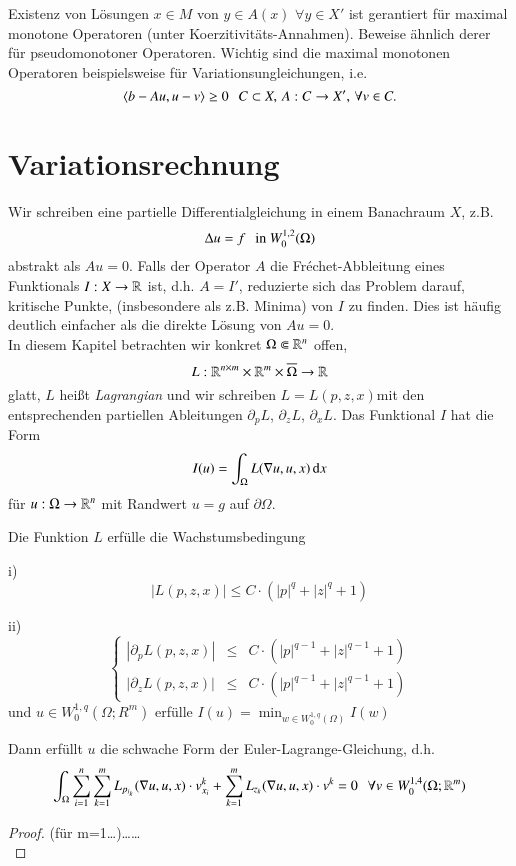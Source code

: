 Existenz von Lösungen $x\in M$ von $y\in A(x)$ $\forall y\in X'$ ist gerantiert für maximal monotone
Operatoren (unter Koerzitivitäts-Annahmen). Beweise ähnlich derer für pseudomonotoner Operatoren.
Wichtig sind die maximal monotonen Operatoren beispielsweise für Variationsungleichungen, i.e.
\[
    \langle b-Au,u-v\rangle \geq 0 \hspace{.25cm} C\subset X, \, A:C\rightarrow X',\, \forall v\in C.
\]

\newpage

\chapter{Variationsrechnung}

Wir schreiben eine partielle Differentialgleichung in einem Banachraum $X$, z.B.
\[
    \Delta u = f \hspace{.25cm} \text{in }W_0^{1,2}(\Omega)
\]
abstrakt als $Au=0$. Falls der Operator $A$ die Fréchet-Abbleitung eines Funktionals $I:X\rightarrow\mathbb{R}$ ist,
d.h. $A=I'$, reduzierte sich das Problem darauf, kritische Punkte, (insbesondere als z.B. Minima) von
$I$ zu finden. Dies ist häufig deutlich einfacher als die direkte Lösung von $Au=0$.\\
\noindent In diesem Kapitel betrachten wir konkret $\Omega \Subset \mathbb{R}^n$ offen,
\[
    L:\mathbb{R}^{n\times m} \times \mathbb{R}^m \times \overline \Omega \rightarrow \mathbb{R}
\]
glatt, $L$ heißt \textit{Lagrangian} und wir schreiben $L= L(p,z,x)$mit den entsprechenden partiellen
Ableitungen $\partial_p L$, $\partial_zL$, $\partial_x L$. Das Funktional $I$ hat die Form
\[
    I(u)=\int_\Omega L(\nabla u , u , x) \, \mathrm{d} x
\]
für $u:\Omega\rightarrow \mathbb{R}^n$ mit Randwert $u=g$ auf $\partial \Omega$.

\begin{theorem}\label{5.1}
    Die Funktion $L$ erfülle die Wachstumsbedingung
    \begin{description}
    \item{i)}
    \[|L(p,z,x)|\leq C\cdot(|p|^q+|z|^q+1) \]
    \item{ii)}
    \[
        \left\{ \begin{array}{lcr} |\partial_pL(p,z,x)|&\leq& C\cdot (|p|^{q-1}+|z|^{q-1}+1)\\
                |\partial _z L(p,z,x)|&\leq& C\cdot(|p|^{q-1}+ |z|^{q-1} + 1) \end{array}\right.
    \]
    und $u \in W_0^{1,q}(\Omega;R^m)$ erfülle $I(u)=\min_{w\in W_0^{1,q}(\Omega)}I(w)$
    \end{description}
    Dann erfüllt $u$ die schwache Form der Euler-Lagrange-Gleichung, d.h.
    \[
        \int_\Omega \sum_{i=1}^n\sum_{k=1}^m L_{p_{i_k}} (\nabla u , u , x) \cdot v_{x_i}^k
        +\sum_{k=1}^m L_{z_k}(\nabla u, u ,x) \cdot v^k =0 \hspace{.25cm} \forall v\in W_0^{1,4}(\Omega;\mathbb{R}^m)
    \]
\end{theorem}


\begin{proof}
    (für m=1…)…… \[ \]
\end{proof}
